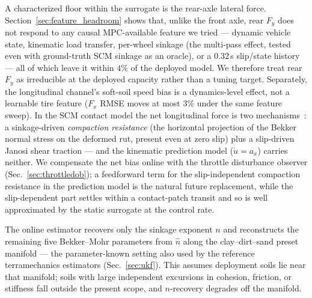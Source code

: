 \documentclass[conference,letterpaper,10pt]{IEEEtran}
\begin{document}
A characterized floor within the surrogate is the rear-axle lateral
force. Section~\ref{sec:feature_headroom} shows that, unlike the front
axle, rear $F_y$ does not respond to any causal MPC-available feature we
tried --- dynamic vehicle state, kinematic load transfer, per-wheel
sinkage (the multi-pass effect, tested even with ground-truth SCM
sinkage as an oracle), or a $0.32$\,s slip/state history --- all of
which leave it within $4\%$ of the deployed model. We therefore treat
rear $F_y$ as irreducible at the deployed capacity rather than a tuning
target. Separately, the longitudinal channel's soft-soil speed bias is a
dynamics-level effect, not a learnable tire feature ($F_x$ RMSE moves at
most $3\%$ under the same feature sweep). In the SCM contact model the
net longitudinal force is two mechanisms~\cite{Krenn09}: a sinkage-driven
\emph{compaction resistance} (the horizontal projection of the Bekker
normal stress on the deformed rut, present even at zero slip) plus a
slip-driven Janosi shear traction --- and the kinematic prediction model
($\dot u\!=\!a_x$) carries neither. We compensate the net bias online with
the throttle disturbance observer (Sec.~\ref{sec:throttledob}); a
feedforward term for the slip-independent compaction resistance in the
prediction model is the natural future replacement, while the
slip-dependent part settles within a contact-patch transit and so is
well approximated by the static surrogate at the control rate.

The online estimator recovers only the sinkage exponent $n$ and
reconstructs the remaining five Bekker--Mohr parameters from $\hat n$
along the clay--dirt--sand preset manifold --- the parameter-known
setting also used by the reference terramechanics estimators
(Sec.~\ref{sec:ukf}). This assumes deployment soils lie near that
manifold; soils with large independent excursions in cohesion, friction,
or stiffness fall outside the present scope, and $n$-recovery degrades
off the manifold.
\end{document}
